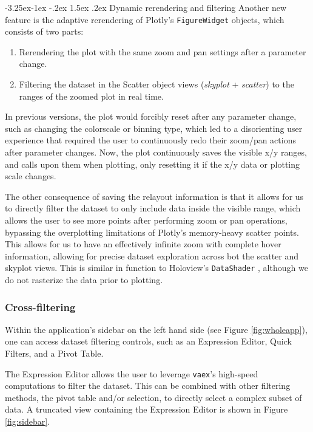 \documentclass[a4paper,10pt,twocolumn]{article}
\makeatletter
\renewcommand\paragraph{\@startsection{paragraph}{4}{\z@}%
	{-3.25ex\@plus -1ex \@minus -.2ex}%
	{1.5ex \@plus .2ex}%
	{\normalfont\normalsize\bfseries}}
\newcommand{\vaex}{\texttt{vaex}}
\makeatother
\begin{document}
\paragraph{Dynamic rerendering and filtering}
\label{sec:rerender}
Another new feature is the adaptive rerendering of Plotly's \texttt{FigureWidget} objects, which consists of two parts:
\begin{enumerate}
	\item Rerendering the plot with the same zoom and pan settings after a parameter change.
	\item Filtering the dataset in the Scatter object views (\emph{skyplot} + \emph{scatter}) to the ranges of the zoomed plot in real time.
\end{enumerate}

In previous versions, the plot would forcibly reset after any parameter change, such as changing the colorscale or binning type, which led to a disorienting user experience that required the user to continuously redo their zoom/pan actions after parameter changes. Now, the plot continuously saves the visible x/y ranges, and calls upon them when plotting, only resetting it if the x/y data or plotting scale changes.

The other consequence of saving the relayout information is that it allows for us to directly filter the dataset to only include data inside the visible range, which allows the user to see more points after performing zoom or pan operations, bypassing the overplotting limitations of Plotly's memory-heavy scatter points. This allows for us to have an effectively infinite zoom with complete hover information, allowing for precise dataset exploration across bot the scatter and skyplot views. This is similar in function to Holoview's \texttt{DataShader} \parencite{holoviews}, although we do not rasterize the data prior to plotting.

\subsubsection{Cross-filtering}
\label{sec:filter}
Within the application's sidebar on the left hand side (see Figure \ref{fig:wholeapp}), one can access dataset filtering controls, such as an Expression Editor, Quick Filters, and a Pivot Table.

The Expression Editor allows the user to leverage \vaex 's high-speed computations to filter the dataset. This can be combined with other filtering methods, the pivot table and/or selection, to directly select a complex subset of data. A truncated view containing the Expression Editor is shown in Figure \ref{fig:sidebar}.
\end{document}

